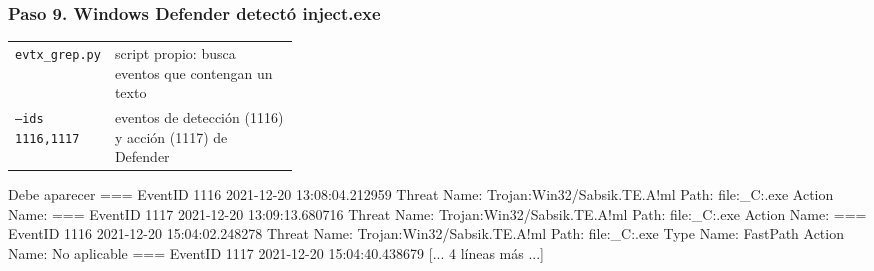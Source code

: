 \documentclass[11pt,a4paper]{article}
\begin{document}
\subsubsection*{Paso 9. Windows Defender detectó inject.exe}
\begin{tcolorbox}[enhanced, breakable, colback=gray!3, colframe=gray!35, boxrule=0.3pt, arc=1pt, left=4pt, right=4pt, top=2pt, bottom=2pt, fonttitle=\sffamily\scriptsize\bfseries, coltitle=black!70, colbacktitle=gray!10, title={Qué hace cada parte}, attach title to upper, before skip=2pt, after skip=4pt, fontupper=\small]
\par{\renewcommand{\arraystretch}{1.12}\begin{tabularx}{\linewidth}{@{}>{\raggedright\arraybackslash}p{0.33\linewidth}>{\raggedright\arraybackslash}X@{}}
\texttt{evtx\_\allowbreak{}grep.py} & script propio: busca eventos que contengan un texto \\
\texttt{--ids 1116,\allowbreak{}1117} & eventos de detección (1116) y acción (1117) de Defender \\
\end{tabularx}}
\end{tcolorbox}
\begin{salida}{Debe aparecer}
=== EventID 1116  2021-12-20 13:08:04.212959
   Threat Name: Trojan:Win32/Sabsik.TE.A!ml
   Path: file:_C:\Users\Public\Downloads\inject.exe
   Action Name: %
=== EventID 1117  2021-12-20 13:09:13.680716
   Threat Name: Trojan:Win32/Sabsik.TE.A!ml
   Path: file:_C:\Users\Public\Downloads\inject.exe
   Action Name: %
=== EventID 1116  2021-12-20 15:04:02.248278
   Threat Name: Trojan:Win32/Sabsik.TE.A!ml
   Path: file:_C:\Users\Gregor\Downloads\inject.exe
   Type Name: FastPath
   Action Name: No aplicable
=== EventID 1117  2021-12-20 15:04:40.438679
[... 4 líneas más ...]
\end{salida}
\end{document}
